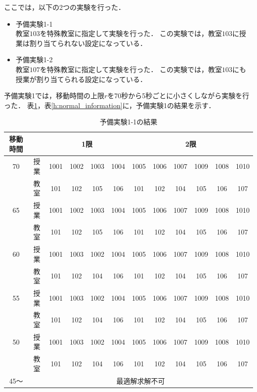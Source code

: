 \documentclass[12pt, a4paper, fleqn]{jreport}
\begin{document}
ここでは，以下の2つの実験を行った．
\begin{itemize}
\item{予備実験1-1}\\
教室$103$を特殊教室に指定して実験を行った．
この実験では，教室$103$に授業は割り当てられない設定になっている．

\item{予備実験1-2}\\
教室$107$を特殊教室に指定して実験を行った．
この実験では，教室$103$にも授業が割り当てられる設定になっている．

\end{itemize}

予備実験1では，移動時間の上限$r$を70秒から5秒ごとに小さくしながら実験を行った．
表\ref{g:normal_information}，表\ref{h:normal_information}に，予備実験1の結果を示す．

\begin{table}[H]
\caption{予備実験1-1の結果}
\label{g:normal_information}
\begin{center}
\begin{tabular}{|c|c||cccc|cccccc|}
\hline
移動時間& & \multicolumn{4}{|c|}{1限} &  \multicolumn{6}{|c|}{2限} \\
\hline
70 & 授業 & 1001 & 1002 & 1003 & 1004 & 1005 & 1006 & 1007 & 1009 & 1008 & 1010 \\ 
& 教室 & 101 & 102 & 105 & 106 & 101 & 102 & 104 & 105 & 106 & 107  \\ \cline{2-11}
\hline
65 & 授業 & 1001 & 1002 & 1003 & 1004 & 1005 & 1006 & 1007 & 1009 & 1008 & 1010 \\ 
& 教室 & 101 & 102 & 105 & 106 & 101 & 102 & 104 & 105 & 106 & 107  \\ \cline{2-11}
\hline
60 & 授業 & 1001 & 1003 & 1002 & 1004 & 1005 & 1006 & 1007 & 1009 & 1008 & 1010 \\ 
& 教室 & 101 & 102 & 104 & 106 & 101 & 102 & 104 & 105 & 106 & 107  \\ \cline{2-11}
\hline
55 & 授業 & 1001 & 1003 & 1002 & 1004 & 1005 & 1006 & 1007 & 1009 & 1008 & 1010 \\
& 教室 & 101 & 102 & 104 & 106 & 101 & 102 & 104 & 105 & 106 & 107  \\\cline{2-11}
\hline
50 & 授業 & 1001 & 1003 & 1002 & 1004 & 1005 & 1006 & 1007 & 1009 & 1008 & 1010 \\ 
& 教室 & 101 & 102 & 104 & 106 & 101 & 102 & 104 & 105 & 106 & 107  \\ \cline{2-11}
\hline
45～  &  \multicolumn{11}{|c|}{最適解求解不可}\\
\hline
\end{tabular}
\end{center}
\end{table}
\end{document}
